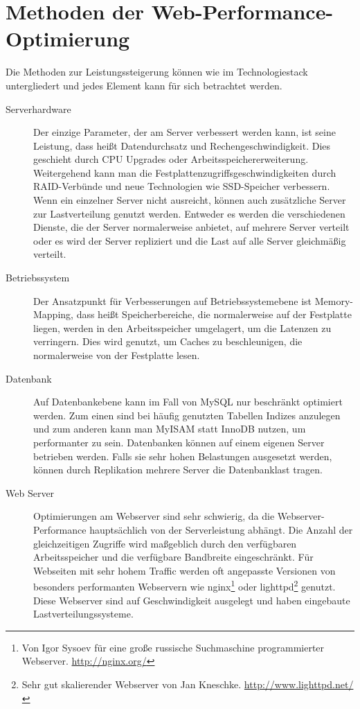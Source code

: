
\section{Methoden der Web-Performance-Optimierung}
Die Methoden zur Leistungssteigerung können wie im Technologiestack untergliedert und jedes Element kann für sich betrachtet werden.

\begin{description}
  \item[Serverhardware] Der einzige Parameter, der am Server verbessert werden kann, ist seine Leistung, dass heißt Datendurchsatz und Rechengeschwindigkeit. Dies geschieht durch CPU Upgrades oder Arbeitsspeichererweiterung. Weitergehend kann man die Festplattenzugriffsgeschwindigkeiten durch RAID-Verbünde und neue Technologien wie SSD-Speicher verbessern. Wenn ein einzelner Server nicht ausreicht, k\"onnen auch zus\"atzliche Server zur Lastverteilung genutzt werden. Entweder es werden die verschiedenen Dienste, die der Server normalerweise anbietet, auf mehrere Server verteilt oder es wird der Server repliziert und die Last auf alle Server gleichm\"a\ss{}ig verteilt.
  \item[Betriebssystem] Der Ansatzpunkt für Verbesserungen auf Betriebssystemebene ist Memory-Mapping, dass heißt Speicherbereiche, die normalerweise auf der Festplatte liegen, werden in den Arbeitsspeicher umgelagert, um die Latenzen zu verringern. Dies wird genutzt, um Caches zu beschleunigen, die normalerweise von der Festplatte lesen.
  \item[Datenbank] Auf Datenbankebene kann im Fall von MySQL nur beschränkt optimiert werden. Zum einen sind bei häufig genutzten Tabellen Indizes anzulegen und zum anderen kann man MyISAM statt InnoDB nutzen, um performanter zu sein. Datenbanken k\"onnen auf einem eigenen Server betrieben werden. Falls sie sehr hohen Belastungen ausgesetzt werden, k\"onnen durch Replikation mehrere Server die Datenbanklast tragen.
  \item[Web Server] Optimierungen am Webserver sind sehr schwierig, da die Webserver-Performance hauptsächlich von der Serverleistung abhängt. Die Anzahl der gleichzeitigen Zugriffe wird maßgeblich durch den verfügbaren Arbeitsspeicher und die verfügbare Bandbreite eingeschränkt. F\"ur Webseiten mit sehr hohem Traffic werden oft angepasste Versionen von besonders performanten Webservern wie nginx\footnote{Von Igor Sysoev f\"ur eine gro\ss{}e russische Suchmaschine programmierter Webserver. \url{http://nginx.org/}} oder lighttpd\footnote{Sehr gut skalierender Webserver von Jan Kneschke. \url{http://www.lighttpd.net/}} genutzt. Diese Webserver sind auf Geschwindigkeit ausgelegt und haben eingebaute Lastverteilungssysteme.

\end{description}

